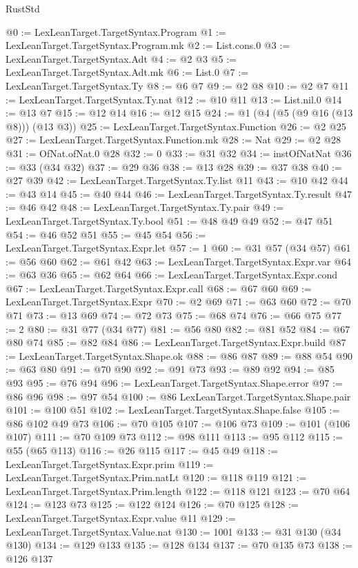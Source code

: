 \begin{lexlean}{RustStd}
\begin{coremodule}
{\begin{coremodule}
{{{{{{{{{{{{{{{{@0 := LexLeanTarget.TargetSyntax.Program
@1 := LexLeanTarget.TargetSyntax.Program.mk
@2 := List.cons.{0}
@3 := LexLeanTarget.TargetSyntax.Adt
@4 := @2 @3
@5 := LexLeanTarget.TargetSyntax.Adt.mk
@6 := List.{0}
@7 := LexLeanTarget.TargetSyntax.Ty
@8 := @6 @7
@9 := @2 @8
@10 := @2 @7
@11 := LexLeanTarget.TargetSyntax.Ty.nat
@12 := @10 @11
@13 := List.nil.{0}
@14 := @13 @7
@15 := @12 @14
@16 := @12 @15
@24 := @1 (@4 (@5 (@9 @16 (@13 @8))) (@13 @3))
@25 := LexLeanTarget.TargetSyntax.Function
@26 := @2 @25
@27 := LexLeanTarget.TargetSyntax.Function.mk
@28 := Nat
@29 := @2 @28
@31 := OfNat.ofNat.{0} @28
@32 := 0
@33 := @31 @32
@34 := instOfNatNat
@36 := @33 (@34 @32)
@37 := @29 @36
@38 := @13 @28
@39 := @37 @38
@40 := @27 @39
@42 := LexLeanTarget.TargetSyntax.Ty.list @11
@43 := @10 @42
@44 := @43 @14
@45 := @40 @44
@46 := LexLeanTarget.TargetSyntax.Ty.result
@47 := @46 @42
@48 := LexLeanTarget.TargetSyntax.Ty.pair
@49 := LexLeanTarget.TargetSyntax.Ty.bool
@51 := @48 @49 @49
@52 := @47 @51
@54 := @46 @52 @51
@55 := @45 @54
@56 := LexLeanTarget.TargetSyntax.Expr.let
@57 := 1
@60 := @31 @57 (@34 @57)
@61 := @56 @60
@62 := @61 @42
@63 := LexLeanTarget.TargetSyntax.Expr.var
@64 := @63 @36
@65 := @62 @64
@66 := LexLeanTarget.TargetSyntax.Expr.cond
@67 := LexLeanTarget.TargetSyntax.Expr.call
@68 := @67 @60
@69 := LexLeanTarget.TargetSyntax.Expr
@70 := @2 @69
@71 := @63 @60
@72 := @70 @71
@73 := @13 @69
@74 := @72 @73
@75 := @68 @74
@76 := @66 @75
@77 := 2
@80 := @31 @77 (@34 @77)
@81 := @56 @80
@82 := @81 @52
@84 := @67 @80 @74
@85 := @82 @84
@86 := LexLeanTarget.TargetSyntax.Expr.build
@87 := LexLeanTarget.TargetSyntax.Shape.ok
@88 := @86 @87
@89 := @88 @54
@90 := @63 @80
@91 := @70 @90
@92 := @91 @73
@93 := @89 @92
@94 := @85 @93
@95 := @76 @94
@96 := LexLeanTarget.TargetSyntax.Shape.error
@97 := @86 @96
@98 := @97 @54
@100 := @86 LexLeanTarget.TargetSyntax.Shape.pair
@101 := @100 @51
@102 := LexLeanTarget.TargetSyntax.Shape.false
@105 := @86 @102 @49 @73
@106 := @70 @105
@107 := @106 @73
@109 := @101 (@106 @107)
@111 := @70 @109 @73
@112 := @98 @111
@113 := @95 @112
@115 := @55 (@65 @113)
@116 := @26 @115
@117 := @45 @49
@118 := LexLeanTarget.TargetSyntax.Expr.prim
@119 := LexLeanTarget.TargetSyntax.Prim.natLt
@120 := @118 @119
@121 := LexLeanTarget.TargetSyntax.Prim.length
@122 := @118 @121
@123 := @70 @64
@124 := @123 @73
@125 := @122 @124
@126 := @70 @125
@128 := LexLeanTarget.TargetSyntax.Expr.value @11
@129 := LexLeanTarget.TargetSyntax.Value.nat
@130 := 1001
@133 := @31 @130 (@34 @130)
@134 := @129 @133
@135 := @128 @134
@137 := @70 @135 @73
@138 := @126 @137
}}}}}}}}}}}}}}}}
\end{coremodule}}
\end{coremodule}
\end{lexlean}
